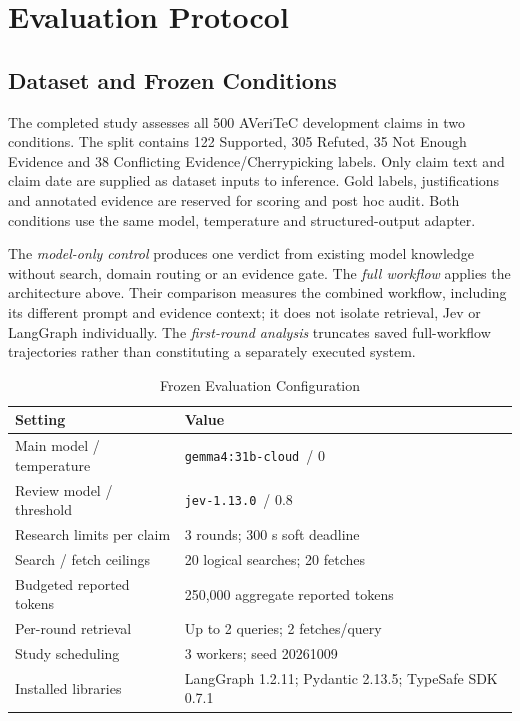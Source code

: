 \documentclass[conference]{IEEEtran}
\newcommand{\modelname}{\texttt{gemma4:31b-cloud}}
\newcommand{\jevname}{\texttt{jev-1.13.0}}
\begin{document}
\section{Evaluation Protocol}
\subsection{Dataset and Frozen Conditions}
The completed study assesses all 500 AVeriTeC development claims in two conditions. The split contains 122 Supported, 305 Refuted, 35 Not Enough Evidence and 38 Conflicting Evidence/Cherrypicking labels. Only claim text and claim date are supplied as dataset inputs to inference. Gold labels, justifications and annotated evidence are reserved for scoring and post hoc audit. Both conditions use the same model, temperature and structured-output adapter.

The \emph{model-only control} produces one verdict from existing model knowledge without search, domain routing or an evidence gate. The \emph{full workflow} applies the architecture above. Their comparison measures the combined workflow, including its different prompt and evidence context; it does not isolate retrieval, Jev or LangGraph individually. The \emph{first-round analysis} truncates saved full-workflow trajectories rather than constituting a separately executed system.

\begin{table}[t]
\caption{Frozen Evaluation Configuration}
\label{tab:protocol}
\centering
\footnotesize
\begin{tabular}{@{}p{}p{}@{}}
\toprule
Setting & Value\\
\midrule
Main model / temperature & \modelname\ / 0\\
Review model / threshold & \jevname\ / 0.8\\
Research limits per claim & 3 rounds; 300 s soft deadline\\
Search / fetch ceilings & 20 logical searches; 20 fetches\\
Budgeted reported tokens & 250,000 aggregate reported tokens\\
Per-round retrieval & Up to 2 queries; 2 fetches/query\\
Study scheduling & 3 workers; seed 20261009\\
Installed libraries & LangGraph 1.2.11; Pydantic 2.13.5; TypeSafe SDK 0.7.1\\
\bottomrule
\end{tabular}
\end{table}
\end{document}
